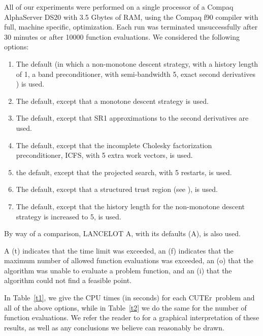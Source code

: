 \documentclass[11pt,twoside]{article}
\newcommand{\lana}{{\sf LANCELOT A}}
\newcommand{\cuter}{{\sf CUTEr}}
\begin{document}
\newpage


All of our experiments were performed 
on a single processor of a Compaq AlphaServer DS20 with 3.5 Gbytes of RAM,
using the Compaq f90 compiler with full, machine specific, optimization.
Each run was terminated unsuccessfully after 30 minutes or after
10000 function evaluations. We considered
the following options:
\begin{enumerate}
\item The default (in which a non-monotone descent strategy, with a
history length of 1, a band preconditioner, with semi-bandwidth 5, exact second
derivatives ) is used.
\item The default, except that a monotone descent strategy is used.
\item The default, except that SR1 approximations to the second derivatives
are used.
\item The default, except that the  incomplete Cholesky 
   factorization preconditioner, ICFS, with 5 extra work vectors, is used.
\item the default, except that the  projected search,
with 5 restarts, is used.
\item The default, except that a structured trust region
   (see ), is used.
\item The default, except that the history length for the 
non-monotone descent strategy is increased to 5, is used.
\end{enumerate}
By way of a comparison, \lana, with its defaults (A), is also used.

A (t) indicates that the time limit was exceeded, an (f) indicates
that the maximum number of allowed function evaluations was exceeded,
an (o) that the algorithm was unable to evaluate a problem function, and an
(i) that the algorithm could not find a feasible point.

In Table~\ref{t1}, we give the CPU times (in seconds) for each 
\cuter\ problem and all of the above options, while in 
Table~\ref{t2} we do the same for the number of function evaluations.
We refer the reader to 
for a graphical interpretation of these results, as well as any
conclusions we believe can reasonably be drawn.
\end{document}
